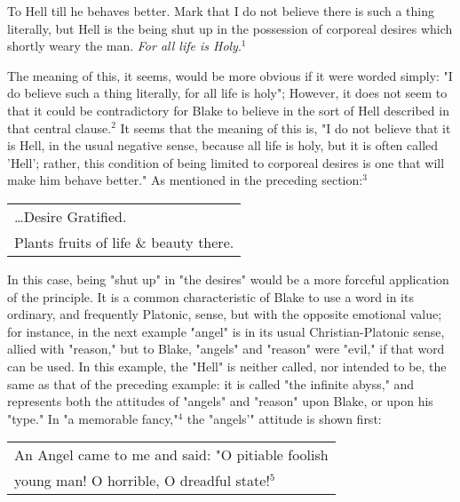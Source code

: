 \begin{center}
	\parbox{0.8\textwidth}{
		\hspace*{5mm}To Hell till he behaves better. Mark that I do not believe there is such
		a thing literally, but Hell is the being shut up in the possession of corporeal
		desires which shortly weary the man. \textit{For all life is Holy}.$^{1}$\par
	}%
\end{center}
\hspace*{5mm}The meaning of this, it seems, would be more obvious if it were worded simply:
"I do believe such a thing literally, for all life is holy";
However, it does not seem to that it could be contradictory for Blake to believe in the sort of 
Hell described in that central clause.$^{2}$ It seems that the meaning of this is, "I do not believe
that it is Hell, in the usual negative sense, because all life is holy, but it is often called 'Hell'; rather,
this condition of being limited to corporeal desires is one that will make him behave better." As mentioned in the
preceding section:$^{3}$\par
\begin{center}
	\parbox{0.8\textwidth}{
		\centering
		\begin{tabular}{l}
			\dots Desire Gratified. \\
			Plants fruits of life \& beauty there.
		\end{tabular}
	}%
\end{center}
\hspace*{5mm}In this case, being "shut up" in "the desires" would be a more forceful application of the principle. It is a 
common characteristic of Blake to use a word in its ordinary, and frequently Platonic, sense, but with the opposite
emotional value; for instance, in the next example "angel" is in its
usual Christian-Platonic sense, allied with "reason," but to Blake, "angels" and "reason" were "evil," if that word can
be used. In this example, the "Hell" is neither called, nor intended to be, the same as that of the preceding example:
it is called "the infinite abyss," and represents both the attitudes of "angels" and "reason" upon Blake, or
upon his "type." In "a memorable fancy,"$^{4}$ the "angels'" attitude is shown first:\par
\begin{center}
	\parbox{0.8\textwidth}{
		\centering
		\begin{tabular}{l}
			An Angel came to me and said: "O pitiable foolish \\
			young man! O horrible, O dreadful state!$^{5}$
		\end{tabular}
	}%
\end{center}
